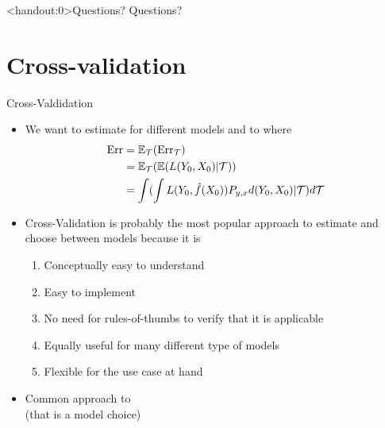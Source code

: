 \documentclass[10pt,handout]{beamer}
\begin{document}
\begin{frame}<handout:0>{Questions?}
Questions?
\end{frame}


\section{Cross-validation}
\frame{\sectionpage}


\begin{frame}{Cross-Valdidation}






\begin{itemize}
\item We want to estimate  for different models and to  where
\begin{align*}
\text{Err} & = \operatorname{\mathbb{E}}_\mathcal{T} (\text{Err}_\mathcal{T}) \\
 & = \operatorname{\mathbb{E}}_\mathcal{T} (\operatorname{\mathbb{E}}(L(Y_0,X_0)|\mathcal{T})) \\
& = \int (\int L(Y_0, \hat{f}(X_0)) P_{y,x} d(Y_0,X_0) |\mathcal{T}) d\mathcal{T}
\end{align*}
\item Cross-Validation is probably the most popular approach to estimate  and choose between models because it is
\begin{enumerate}
\item Conceptually easy to understand
\item Easy to implement
\item No need for rules-of-thumbs to verify that it is applicable
\item Equally useful for many different type of models
\item Flexible for the use case at hand
\end{enumerate}
\pause
\item Common approach to \\(that is a model choice)
\end{itemize}

\end{frame}
\end{document}

